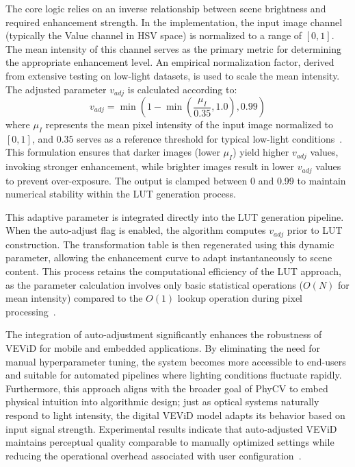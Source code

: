 \documentclass[journal,transmag]{IEEEtran}
\begin{document}
The core logic relies on an inverse relationship between scene brightness and required enhancement strength. In the implementation, the input image channel (typically the Value channel in HSV space) is normalized to a range of $[0, 1]$. The mean intensity of this channel serves as the primary metric for determining the appropriate enhancement level. An empirical normalization factor, derived from extensive testing on low-light datasets, is used to scale the mean intensity. The adjusted parameter $v_{adj}$ is calculated according to:
\begin{equation}
    v_{adj} = \min\left(1 - \min\left(\frac{\mu_I}{0.35}, 1.0\right), 0.99\right)
\end{equation}
where $\mu_I$ represents the mean pixel intensity of the input image normalized to $[0, 1]$, and $0.35$ serves as a reference threshold for typical low-light conditions~\cite{zhou2024simplification}. This formulation ensures that darker images (lower $\mu_I$) yield higher $v_{adj}$ values, invoking stronger enhancement, while brighter images result in lower $v_{adj}$ values to prevent over-exposure. The output is clamped between 0 and 0.99 to maintain numerical stability within the LUT generation process.

This adaptive parameter is integrated directly into the LUT generation pipeline. When the auto-adjust flag is enabled, the algorithm computes $v_{adj}$ prior to LUT construction. The transformation table is then regenerated using this dynamic parameter, allowing the enhancement curve to adapt instantaneously to scene content. This process retains the computational efficiency of the LUT approach, as the parameter calculation involves only basic statistical operations ($O(N)$ for mean intensity) compared to the $O(1)$ lookup operation during pixel processing~\cite{bradski2008opencv}.

The integration of auto-adjustment significantly enhances the robustness of VEViD for mobile and embedded applications. By eliminating the need for manual hyperparameter tuning, the system becomes more accessible to end-users and suitable for automated pipelines where lighting conditions fluctuate rapidly. Furthermore, this approach aligns with the broader goal of PhyCV to embed physical intuition into algorithmic design; just as optical systems naturally respond to light intensity, the digital VEViD model adapts its behavior based on input signal strength. Experimental results indicate that auto-adjusted VEViD maintains perceptual quality comparable to manually optimized settings while reducing the operational overhead associated with user configuration~\cite{zhou2023phycv}.
\end{document}
